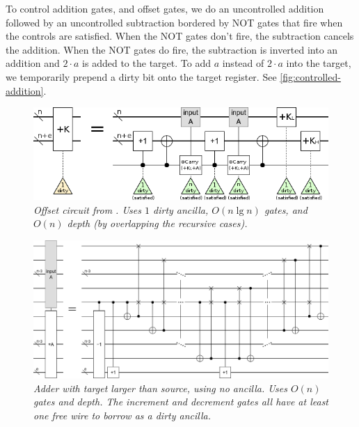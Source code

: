 \documentclass[twocolumn]{article}
\begin{document}
To control addition gates, and offset gates, we do an uncontrolled addition followed by an uncontrolled subtraction bordered by NOT gates that fire when the controls are satisfied.
When the NOT gates don't fire, the subtraction cancels the addition.
When the NOT gates do fire, the subtraction is inverted into an addition and $2 \cdot a$ is added to the target.
To add $a$ instead of $2 \cdot a$ into the target, we temporarily prepend a dirty bit onto the target register.
See \ref{fig:controlled-addition}.

\begin{figure}
  \centering
  \includegraphics[width=\linewidth]{assets/offset.png}
  \caption{\em
      Offset circuit from \cite{haner2016}.
      Uses $1$ dirty ancilla, $O(n \lg n)$ gates, and $O(n)$ depth (by overlapping the recursive cases).
  }
  \label{fig:offset}
\end{figure}

\begin{figure}
  \centering
  \includegraphics[width=\linewidth]{assets/inline-adder-into-large.png}
  \caption{\em
      Adder with target larger than source, using no ancilla.
      Uses $O(n)$ gates and depth.
      The increment and decrement gates all have at least one free wire to borrow as a dirty ancilla.}
  \label{fig:inline-adder-into-large}
\end{figure}
\end{document}
